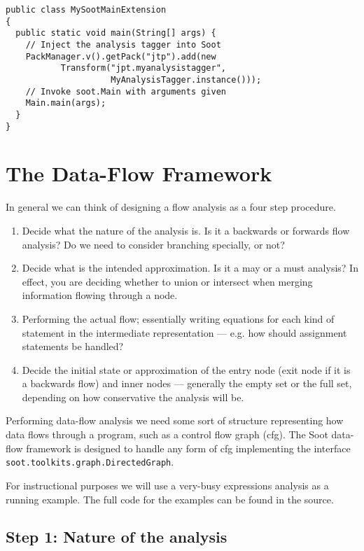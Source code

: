 \documentclass{article}
\newcommand{\code}[1]{\texttt{\small #1}}
\begin{document}
\begin{center}
  \begin{minipage}{0.9 \linewidth}
    \begin{verbatim}
public class MySootMainExtension
{
  public static void main(String[] args) {
    // Inject the analysis tagger into Soot
    PackManager.v().getPack("jtp").add(new
           Transform("jpt.myanalysistagger",
                     MyAnalysisTagger.instance()));
    // Invoke soot.Main with arguments given
    Main.main(args);
  }
}
    \end{verbatim}
  \end{minipage}
\end{center}

\section{The Data-Flow Framework}

In general we can think of designing a flow analysis as a four step
procedure.
\begin{enumerate}
\item Decide what the nature of the analysis is. Is it a backwards or
  forwards flow analysis? Do we need to consider branching specially,
  or not?
\item Decide what is the intended approximation. Is it a may or a must
  analysis? In effect, you are deciding whether to union or intersect
  when merging information flowing through a node.
\item Performing the actual flow; essentially writing equations for
  each kind of statement in the intermediate representation --- e.g.
  how should assignment statements be handled?
\item Decide the initial state or approximation of the entry node
  (exit node if it is a backwards flow) and inner nodes --- generally
  the empty set or the full set, depending on how conservative the
  analysis will be.
\end{enumerate}
Performing data-flow analysis we need some sort of structure
representing how data flows through a program, such as a control flow
graph (cfg). The Soot data-flow framework is designed to handle any
form of cfg implementing the interface 
\code{soot.toolkits.graph.DirectedGraph}.

For instructional purposes we will use a very-busy expressions
analysis as a running example. The full code for the examples can be
found in the source.

\subsection{Step 1: Nature of the analysis}
\end{document}
